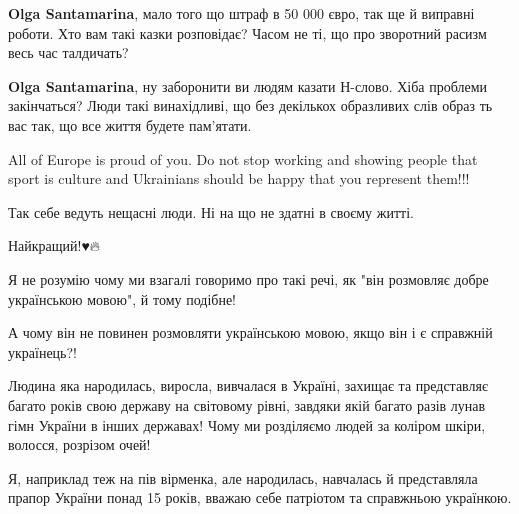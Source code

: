 \begin{itemize}
\begin{itemize}
 
\textbf{Olga Santamarina}, мало того що штраф в 50 000 євро, так ще й виправні роботи. Хто вам такі казки розповідає?
Часом не ті, що про зворотний расизм весь час талдичать?

 
\textbf{Olga Santamarina}, ну заборонити ви людям казати Н-слово. Хіба проблеми закінчаться?
Люди такі винахідливі, що без декількох образливих слів образ ть вас так, що все життя будете пам'ятати.
\end{itemize}


All of Europe is proud of you. Do not stop working and showing people that
sport is culture and Ukrainians should be happy that you represent them!!!


Так себе ведуть нещасні люди. Ні на що не здатні в своєму житті.

Найкращий!♥️🔥


Я не розумію чому ми взагалі говоримо про такі речі, як "він розмовляє добре
українською мовою", й тому подібне!

А чому він не повинен розмовляти українською мовою, якщо він і є справжній
українець?!

Людина яка народилась, виросла, вивчалася в Україні, захищає та представляє
багато років свою державу на світовому рівні, завдяки якій багато разів лунав
гімн України в інших державах! Чому ми розділяємо людей за коліром шкіри,
волосся, розрізом очей!

Я, наприклад теж на пів вірменка, але народилась, навчалась й представляла
прапор України понад 15 років, вважаю себе патріотом та справжньою українкою.


\end{itemize}
